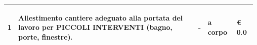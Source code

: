 \documentclass[a4paper]{article}
\begin{document}
\begin{tabular}{ | L{10mm} |  L{86mm} | L{12mm} | L{12mm} | L{16mm} | }
                              \vspace{2.5mm}
                              \begin{spacing}{0}
                           1
                              \end{spacing} &
                              \vspace{2.5mm}
                              \begin{spacing}{0}
                           Allestimento cantiere adeguato alla portata del lavoro per PICCOLI INTERVENTI (bagno, porte, finestre). 
                              \end{spacing} &
                              \vspace{2.5mm}
                              \begin{spacing}{0}
                           -
                              \end{spacing} &
                              \vspace{2.5mm}
                              \begin{spacing}{0}
                           a corpo
                              \end{spacing} &
                              \vspace{2.5mm}
                              \begin{spacing}{0}
                                \euro\hfill 
                            0.0
                              \end{spacing} \\
                              \hline
            

\end{tabular}
\end{document}
